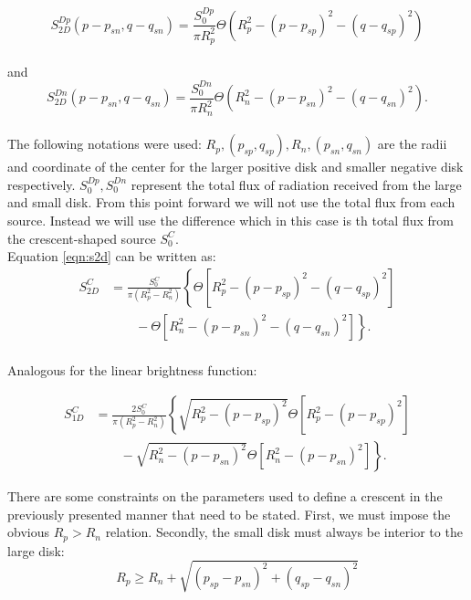 \begin{equation}
 S_{2D}^{Dp}(p-p_{sn}, q-q_{sn}) = \frac{S_0^{Dp}}{\pi R_p^2} \Theta \left( R_p^2 - \left( p-p_{sp} \right)^2 - \left( q-q_{sp} \right)^2 \right)
\end{equation}
\\
and
\begin{equation}
 S_{2D}^{Dn}(p-p_{sn}, q-q_{sn}) = \frac{S_0^{Dn}}{\pi R_n^2} \Theta \left( R_n^2 - \left( p-p_{sn} \right)^2 - \left( q-q_{sn} \right)^2 \right).
\end{equation}
\\
The following notations were used: $R_p, (p_{sp}, q_{sp}), R_n, (p_{sn},q_{sn})$ are the radii and coordinate of the center for the larger positive disk and smaller negative disk respectively.  $S_0^{Dp},S_0^{Dn}$ represent the total flux of radiation received from the large and small disk. From this point forward we will not use the total flux from each source. Instead we will 
use the difference which in this case is th total flux from the crescent-shaped source $S_0^C$. \\
Equation \ref{eqn:s2d} can be written as:\\

\begin{align}
 S_{2D}^C &= \frac{S_0^C}{\pi \left(R_p^2-R_n^2 \right)} \left\{ \Theta \left[ R_p^2 - \left( p-p_{sp} \right)^2 - \left( q-q_{sp} \right)^2 \right] \right.\nonumber\\
 &\qquad \left. {} -  \Theta \left[ R_n^2 - \left( p-p_{sn} \right)^2 - \left( q-q_{sn} \right)^2 \right] \right\}.
\end{align}
\\
Analogous for the linear brightness function:

\begin{align}
 S_{1D}^C &= \frac{2 S_0^C}{\pi \left(R_p^2-R_n^2 \right)} \left\{ \sqrt{R_p^2 - (p-p_{sp})^2}  \Theta \left[ R_p^2 - \left( p-p_{sp} \right)^2 \right] \right.\nonumber\\
 &\qquad \left. {} - \sqrt{R_n^2 - (p-p_{sn})^2 } \Theta \left[ R_n^2 - \left( p-p_{sn} \right)^2 \right] \right\}.
\label{eqn:s1_d}
\end{align}


There are some constraints on the parameters used to define a crescent in the previously presented manner that need to be stated. First, we must impose the obvious $R_p > R_n$ relation. Secondly, 
the small disk must always be interior to the large disk:
\begin{equation}
 R_p \ge R_n + \sqrt{\left(p_{sp} - p_{sn} \right)^2 + \left(q_{sp} - q_{sn} \right)^2}
\end{equation}

